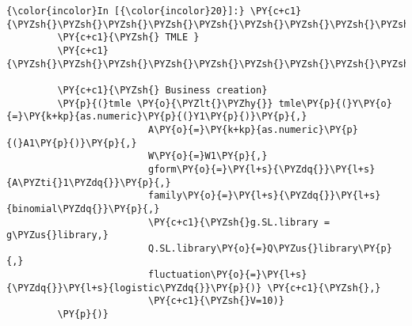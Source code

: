    \begin{Verbatim}[commandchars=\\\{\}]
{\color{incolor}In [{\color{incolor}20}]:} \PY{c+c1}{\PYZsh{}\PYZsh{}\PYZsh{}\PYZsh{}\PYZsh{}\PYZsh{}\PYZsh{}\PYZsh{}\PYZsh{}\PYZsh{}\PYZsh{}\PYZsh{}\PYZsh{}\PYZsh{}\PYZsh{}\PYZsh{}\PYZsh{}\PYZsh{}\PYZsh{}\PYZsh{}\PYZsh{}\PYZsh{}\PYZsh{}\PYZsh{}\PYZsh{}\PYZsh{}\PYZsh{}\PYZsh{}\PYZsh{}\PYZsh{}\PYZsh{}\PYZsh{}\PYZsh{}\PYZsh{}\PYZsh{}\PYZsh{}\PYZsh{}\PYZsh{}\PYZsh{}\PYZsh{}\PYZsh{}\PYZsh{}\PYZsh{}\PYZsh{}\PYZsh{}\PYZsh{}\PYZsh{}\PYZsh{}\PYZsh{}\PYZsh{}\PYZsh{}}
         \PY{c+c1}{\PYZsh{} TMLE }
         \PY{c+c1}{\PYZsh{}\PYZsh{}\PYZsh{}\PYZsh{}\PYZsh{}\PYZsh{}\PYZsh{}\PYZsh{}\PYZsh{}\PYZsh{}\PYZsh{}\PYZsh{}\PYZsh{}\PYZsh{}\PYZsh{}\PYZsh{}\PYZsh{}\PYZsh{}\PYZsh{}\PYZsh{}\PYZsh{}\PYZsh{}\PYZsh{}\PYZsh{}\PYZsh{}\PYZsh{}\PYZsh{}\PYZsh{}\PYZsh{}\PYZsh{}\PYZsh{}\PYZsh{}\PYZsh{}\PYZsh{}\PYZsh{}\PYZsh{}\PYZsh{}\PYZsh{}\PYZsh{}\PYZsh{}\PYZsh{}\PYZsh{}\PYZsh{}\PYZsh{}\PYZsh{}\PYZsh{}\PYZsh{}\PYZsh{}\PYZsh{}\PYZsh{}\PYZsh{}}
         
         \PY{c+c1}{\PYZsh{} Business creation}
         \PY{p}{(}tmle \PY{o}{\PYZlt{}\PYZhy{}} tmle\PY{p}{(}Y\PY{o}{=}\PY{k+kp}{as.numeric}\PY{p}{(}Y1\PY{p}{)}\PY{p}{,}
                         A\PY{o}{=}\PY{k+kp}{as.numeric}\PY{p}{(}A1\PY{p}{)}\PY{p}{,}
                         W\PY{o}{=}W1\PY{p}{,}
                         gform\PY{o}{=}\PY{l+s}{\PYZdq{}}\PY{l+s}{A\PYZti{}1\PYZdq{}}\PY{p}{,}
                         family\PY{o}{=}\PY{l+s}{\PYZdq{}}\PY{l+s}{binomial\PYZdq{}}\PY{p}{,}
                         \PY{c+c1}{\PYZsh{}g.SL.library = g\PYZus{}library,}
                         Q.SL.library\PY{o}{=}Q\PYZus{}library\PY{p}{,}
                         fluctuation\PY{o}{=}\PY{l+s}{\PYZdq{}}\PY{l+s}{logistic\PYZdq{}}\PY{p}{)} \PY{c+c1}{\PYZsh{},}
                         \PY{c+c1}{\PYZsh{}V=10)}
         \PY{p}{)}
\end{Verbatim}


